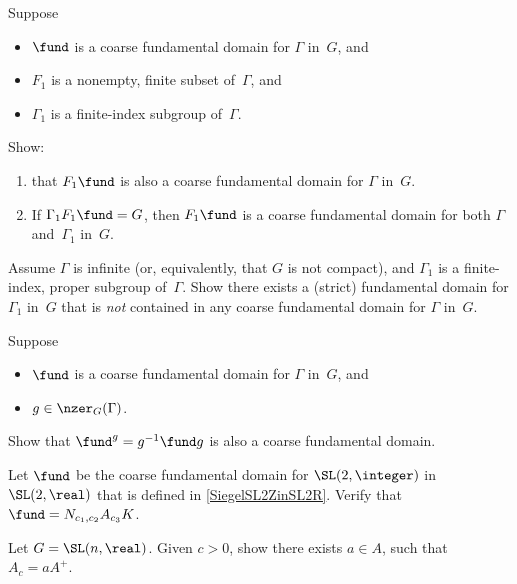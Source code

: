 \begin{exercises}
\item \label{WeakFundDomFinInd}
Suppose 
	\begin{itemize}
	\item $\fund$ is a coarse fundamental domain for $\Gamma$ in~$G$, 
	and
	\item  $F_1$ is a nonempty, finite subset of~$\Gamma$,
	and
	\item $\Gamma_1$ is a finite-index subgroup of~$\Gamma$. 
	\end{itemize}
Show:
	\begin{enumerate}
	\item that $F_1 \fund$ is also a coarse fundamental domain for $\Gamma$ in~$G$.
	\item \label{WeakFundDomFinInd-IsFund}
	If $\Gamma_1 F_1 \fund = G$, then $F_1 \fund$ is a  coarse fundamental domain for both $\Gamma$ and~$\Gamma_1$ in~$G$. 
	\end{enumerate}

\item Assume $\Gamma$ is infinite (or, equivalently, that $G$ is not compact), and $\Gamma_1$ is a finite-index, proper subgroup of~$\Gamma$. Show there exists a (strict) fundamental domain for $\Gamma_1$ in~$G$ that is \emph{not} contained in any coarse fundamental domain for $\Gamma$ in~$G$.

\item \label{ConjFundDomsInGIsWeak}
Suppose 
	\begin{itemize}
	\item $\fund$ is a coarse fundamental domain for $\Gamma$ in~$G$, 
	and
	\item  $g \in \nzer_G(\Gamma)$.
	\end{itemize}
Show that  $\fund^g = g^{-1} \fund g$ is also a coarse fundamental domain.

\item \label{FIsSiegelSet}
Let $\fund$ be the coarse fundamental domain for $\SL(2,\integer)$ in $\SL(2,\real)$ that is  defined in \cref{SiegelSL2ZinSL2R}. Verify that $\fund = N_{c_1,c_2} A_{c_3} K$.

\item \label{Ac=aA+}
Let $G = \SL(n,\real)$. Given $c > 0$, show there exists $a \in A$, such that $A_c = a A^+$.


\end{exercises}
